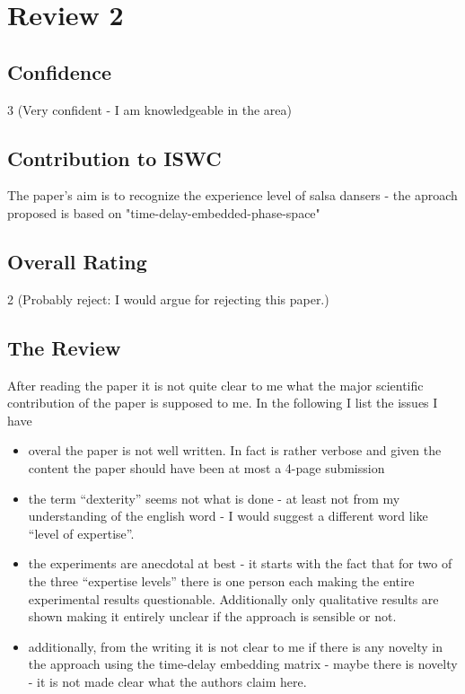 \documentclass[8pt]{article}
\begin{document}
   
\section{Review 2}
\subsection{Confidence}
3  (Very confident - I am knowledgeable in the area)

\subsection{Contribution to ISWC}
   The paper's aim is to recognize the experience level of salsa dansers -
   the aproach proposed is based on "time-delay-embedded-phase-space"
   
\subsection{Overall Rating}
   2  (Probably reject: I would argue for rejecting this paper.)
   
\subsection{The Review}
   After reading the paper it is not quite clear to me what the major
   scientific contribution of the paper is supposed to me. In the following
   I list the issues I have

   \begin{itemize}[topsep=0pt,itemsep=-1ex,partopsep=1ex,parsep=1ex]
   \item overal the paper is not well written. In fact is rather verbose and
   given the content the paper should have been at most a 4-page submission
   \item the term ``dexterity'' seems not what is done - at least not from my
   understanding of the english word - I would suggest a different word like
   ``level of expertise''.
   \item the experiments are anecdotal at best - it starts with the fact that
   for two of the three ``expertise levels'' there is one person each making
   the entire experimental results questionable. Additionally only
   qualitative results are shown making it entirely unclear if the approach
   is sensible or not.
   \item additionally, from the writing it is not clear to me if there is any
   novelty in the approach using the time-delay embedding matrix - maybe
   there is novelty - it is not made clear what the authors claim here.
   \end{itemize}
   
\end{document}
